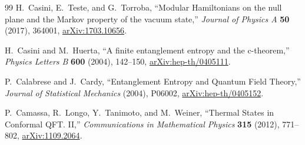 \documentclass[11pt]{article}
\theoremstyle{accenttheorem}
\theoremstyle{definition}
\newcommand{\1}{\mathbf{1}}
\begin{document}
\begin{thebibliography}{99}
H.~Casini, E.~Teste, and G.~Torroba,
``Modular Hamiltonians on the null plane and the Markov property of the vacuum state,''
\emph{Journal of Physics A} \textbf{50} (2017), 364001,
\href{https://arxiv.org/abs/1703.10656}{arXiv:1703.10656}.

H.~Casini and M.~Huerta,
``A finite entanglement entropy and the c-theorem,''
\emph{Physics Letters B} \textbf{600} (2004), 142--150,
\href{https://arxiv.org/abs/hep-th/0405111}{arXiv:hep-th/0405111}.

P.~Calabrese and J.~Cardy,
``Entanglement Entropy and Quantum Field Theory,''
\emph{Journal of Statistical Mechanics} (2004), P06002,
\href{https://arxiv.org/abs/hep-th/0405152}{arXiv:hep-th/0405152}.

P.~Camassa, R.~Longo, Y.~Tanimoto, and M.~Weiner,
``Thermal States in Conformal QFT. II,''
\emph{Communications in Mathematical Physics} \textbf{315} (2012), 771--802,
\href{https://arxiv.org/abs/1109.2064}{arXiv:1109.2064}.

\end{thebibliography}
\end{document}
